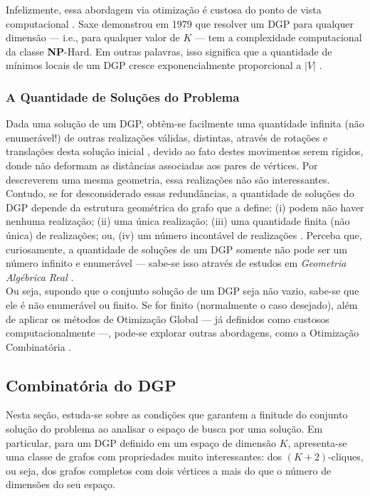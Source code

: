 Infelizmente, essa abordagem via otimização é custosa do ponto de vista computacional \cite{libertiEDG}. Saxe demonstrou em 1979 \cite{Saxe:79} que resolver um DGP para qualquer dimensão --- i.e., para qualquer valor de $K$ --- tem a complexidade computacional da classe \textbf{NP}-Hard. Em outras palavras, isso significa que a quantidade de mínimos locais de um DGP cresce exponencialmente proporcional a $|V|$ \cite{carlileIntroductionMDGP}. 

\subsubsection{A Quantidade de Soluções do Problema}
Dada uma solução de um DGP, obtêm-se facilmente uma quantidade infinita (não enumerável!) de outras realizações válidas, distintas, através de rotações e translações desta solução inicial \cite{carlileBook31Coloquio}, devido ao fato destes movimentos serem rígidos, donde não deformam as distâncias associadas aos pares de vértices. Por descreverem uma mesma geometria, essa realizações não são interessantes. Contudo, se for desconsiderado essas redundâncias, a quantidade de soluções do DGP depende da estrutura geométrica do grafo que a define: (i) podem não haver nenhuma realização; (ii) uma única realização; (iii) uma quantidade finita (não única) de realizações; ou, (iv) um número incontável de realizações \cite{libertiEDG}. Perceba que, curiosamente, a quantidade de soluções de um DGP somente não pode ser um número infinito e enumerável --- sabe-se isso através de estudos em \textit{Geometria Algébrica Real} \cite{benedettireal}.\\
 
Ou seja, supondo que o conjunto solução de um DGP seja não vazio, sabe-se que ele é não enumerável ou finito. Se for finito (normalmente o caso desejado), além de aplicar os métodos de Otimização Global --- já definidos como custosos computacionalmente ---, pode-se explorar outras abordagens, como a Otimização Combinatória \cite{carlileBook31Coloquio}. 

\subsection{Combinatória do DGP}

Nesta seção, estuda-se sobre as condições que garantem a finitude do conjunto solução do problema ao analisar o espaço de busca por uma solução. Em particular, para um DGP definido em um espaço de dimensão $K$, apresenta-se uma classe de grafos com propriedades muito interessantes: dos $(K+2)$-cliques, ou seja, dos grafos completos com dois vértices a mais do que o número de dimensões do seu espaço.

